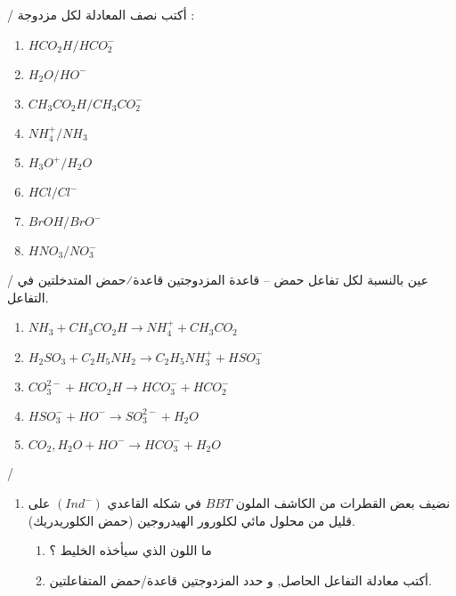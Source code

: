 \documentclass[14pt,a4paper]{extarticle}
\begin{document}
{
\begin{exercice}{}/
أكتب نصف المعادلة لكل مزدوجة :

\begin{minipage}{0.49\linewidth}
\indent
\begin{enumerate}
\item
$HCO_2H/HCO_2^{-}$
\item
$H_2O/HO^{-}$
\item
$CH_3CO_2H/CH_3CO_2^{-}$
\item
$NH_4^{+}/NH_3$
\end{enumerate}
\end{minipage}
\begin{minipage}{0.5\linewidth}
\begin{enumerate}
\setcounter{enumi}{4}
\item
$H_3O^{+}/H_2O$
\item
$HCl/Cl^{-}$
\item
$BrOH/BrO^{-}$
\item
$HNO_3/NO_3^{-}$
\end{enumerate}
\end{minipage}
\end{exercice}{}
\begin{exercice}{}/
عين بالنسبة لكل تفاعل حمض – قاعدة المزدوجتين
قاعدة⁄حمض المتدخلتين في التفاعل.
\begin{enumerate}
\item \hrulefill
$NH_3 + CH_3CO_2H \rightarrow NH_4^{+} + CH_3CO_2$
\item \hrulefill
$H_2SO_3 + C_2H_5NH_2 \rightarrow C_2H_5NH_3^{+} + HSO_3^{-}$ 
\item \hrulefill
$CO_3^{2-} + HCO_2H \rightarrow HCO_3^{-} + HCO_2^{-}$
\item \hrulefill
$HSO_3^{-} + HO^{-} \rightarrow SO_3^{2-} + H_2O$
\item \hrulefill
$CO_2,H_2O + HO^{-} \rightarrow HCO_3^{-} + H_2O$
\end{enumerate}
\end{exercice}{}
\begin{exercice}{}/
\begin{enumerate}
\item
نضيف بعض القطرات من الكاشف الملون
$BBT$
في شكله القاعدي
$(Ind^-)$
على قليل من محلول مائي لكلورور الهيدروجين (حمض الكلوريدريك).
\begin{enumerate}
\item ما اللون الذي سيأخذه الخليط ؟
\item أكتب معادلة التفاعل الحاصل, و حدد المزدوجتين قاعدة/حمض المتفاعلتين.

\end{enumerate}
\end{enumerate}
\end{exercice}}
\end{document}
